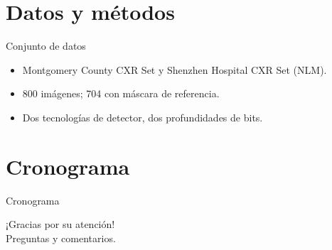 \documentclass[12pt]{beamer}
\begin{document}
\section{Datos y métodos}
\begin{frame}{Conjunto de datos}
    \begin{itemize}
        \item Montgomery County CXR Set y Shenzhen Hospital CXR Set (NLM).
        \item 800 imágenes; 704 con máscara de referencia.
        \item Dos tecnologías de detector, dos profundidades de bits.
    \end{itemize}
\end{frame}

\section{Cronograma}
\begin{frame}{Cronograma}
\end{frame}

\begin{frame}[plain]
    \centering
    \Huge ¡Gracias por su atención!\\[1cm]
    \small Preguntas y comentarios.
\end{frame}
\end{document}
